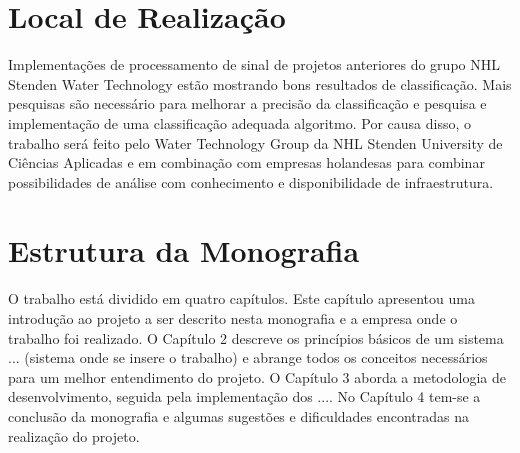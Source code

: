 \section{Local de Realização}
\label{sec:empresa}

Implementações de processamento de sinal de projetos anteriores
do grupo NHL Stenden Water Technology estão mostrando bons resultados de classificação. Mais pesquisas são
necessário para melhorar a precisão da classificação e pesquisa e implementação de uma classificação adequada
algoritmo. Por causa disso, o trabalho será feito pelo Water Technology Group da NHL Stenden University
de Ciências Aplicadas e em combinação com empresas holandesas para combinar possibilidades de análise com conhecimento
e disponibilidade de infraestrutura.

\section{Estrutura da Monografia}
\label{sec:organizacao}

O trabalho está dividido em quatro capítulos. Este capítulo apresentou uma introdução ao projeto a ser descrito nesta monografia e a empresa onde o trabalho foi realizado. O Capítulo 2 descreve os princípios básicos de um sistema ... (sistema onde se insere o trabalho) e abrange todos os conceitos necessários para um melhor entendimento do projeto. O Capítulo 3 aborda a metodologia de desenvolvimento, seguida pela implementação dos .... No Capítulo 4 tem-se a conclusão da  monografia e algumas sugestões e dificuldades encontradas na realização do projeto.


\clearpage